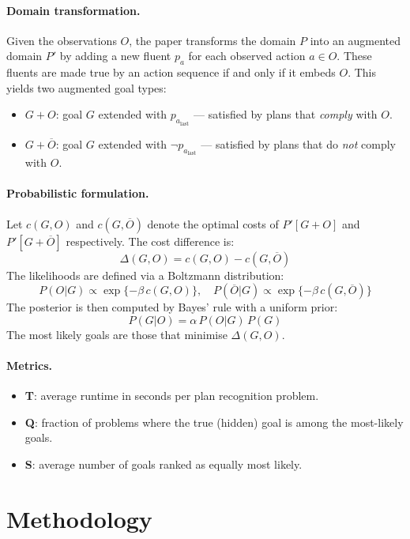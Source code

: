 \documentclass[10pt,twocolumn]{article}
\begin{document}
\paragraph{Domain transformation.}
Given the observations $O$, the paper transforms the domain $P$ into an augmented domain $P'$ by adding a new fluent $p_a$ for each observed action $a \in O$. These fluents are made true by an action sequence if and only if it embeds $O$. This yields two augmented goal types:
\begin{itemize}
  \item $G{+}O$: goal $G$ extended with $p_{a_{\text{last}}}$ — satisfied by plans that \emph{comply} with $O$.
  \item $G{+}\overline{O}$: goal $G$ extended with $\neg p_{a_{\text{last}}}$ — satisfied by plans that do \emph{not} comply with $O$.
\end{itemize}

\paragraph{Probabilistic formulation.}
Let $c(G, O)$ and $c(G, \overline{O})$ denote the optimal costs of $P'[G{+}O]$ and $P'[G{+}\overline{O}]$ respectively. The cost difference is:
\[
\Delta(G, O) = c(G, O) - c(G, \overline{O})
\]
The likelihoods are defined via a Boltzmann distribution:
\[
P(O|G) \propto \exp\{-\beta\, c(G, O)\}, \quad P(\overline{O}|G) \propto \exp\{-\beta\, c(G, \overline{O})\}
\]
The posterior is then computed by Bayes' rule with a uniform prior:
\[
P(G|O) = \alpha\, P(O|G)\, P(G)
\]
The most likely goals are those that minimise $\Delta(G, O)$.

\paragraph{Metrics.}
\begin{itemize}
  \item \textbf{T}: average runtime in seconds per plan recognition problem.
  \item \textbf{Q}: fraction of problems where the true (hidden) goal is among the most-likely goals.
  \item \textbf{S}: average number of goals ranked as equally most likely.
\end{itemize}

\section{Methodology}
\end{document}
